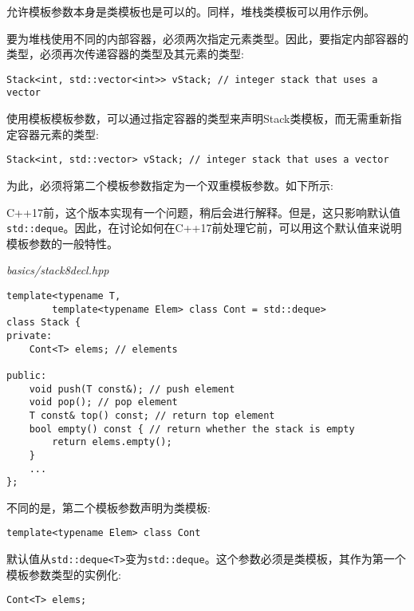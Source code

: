 允许模板参数本身是类模板也是可以的。同样，堆栈类模板可以用作示例。

要为堆栈使用不同的内部容器，必须两次指定元素类型。因此，要指定内部容器的类型，必须再次传递容器的类型及其元素的类型:

\begin{lstlisting}[style=styleCXX]
Stack<int, std::vector<int>> vStack; // integer stack that uses a vector
\end{lstlisting}

使用模板模板参数，可以通过指定容器的类型来声明Stack类模板，而无需重新指定容器元素的类型:

\begin{lstlisting}[style=styleCXX]
Stack<int, std::vector> vStack; // integer stack that uses a vector
\end{lstlisting}

为此，必须将第二个模板参数指定为一个双重模板参数。如下所示:

\begin{tcolorbox}[colback=webgreen!5!white,colframe=webgreen!75!black]
\hspace*{0.75cm}C++17前，这个版本实现有一个问题，稍后会进行解释。但是，这只影响默认值\texttt{std::deque}。因此，在讨论如何在C++17前处理它前，可以用这个默认值来说明模板参数的一般特性。
\end{tcolorbox}

\noindent
\textit{basics/stack8decl.hpp}
\begin{lstlisting}[style=styleCXX]
template<typename T,
		template<typename Elem> class Cont = std::deque>
class Stack {
private:
	Cont<T> elems; // elements
	
public:
	void push(T const&); // push element
	void pop(); // pop element
	T const& top() const; // return top element
	bool empty() const { // return whether the stack is empty
		return elems.empty();
	}
	...
};
\end{lstlisting}

不同的是，第二个模板参数声明为类模板:

\begin{lstlisting}[style=styleCXX]
template<typename Elem> class Cont
\end{lstlisting}

默认值从\texttt{std::deque<T>}变为\texttt{std::deque}。这个参数必须是类模板，其作为第一个模板参数类型的实例化:

\begin{lstlisting}[style=styleCXX]
Cont<T> elems;
\end{lstlisting}

